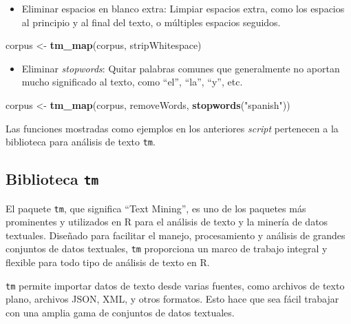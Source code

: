 \documentclass[
]{article}
\newenvironment{Shaded}{\begin{snugshade}}{\end{snugshade}}
\newcommand{\FunctionTok}[1]{\textcolor[rgb]{0.13,0.29,0.53}{\textbf{#1}}}
\newcommand{\NormalTok}[1]{#1}
\newcommand{\OtherTok}[1]{\textcolor[rgb]{0.56,0.35,0.01}{#1}}
\newcommand{\StringTok}[1]{\textcolor[rgb]{0.31,0.60,0.02}{#1}}
\providecommand{\tightlist}{%
  \setlength{\itemsep}{0pt}\setlength{\parskip}{0pt}}
\begin{document}
\begin{itemize}
\tightlist
\item
  Eliminar espacios en blanco extra: Limpiar espacios extra, como los
  espacios al principio y al final del texto, o múltiples espacios
  seguidos.
\end{itemize}

\begin{Shaded}
\begin{Highlighting}[]
\NormalTok{corpus }\OtherTok{\textless{}{-}} \FunctionTok{tm\_map}\NormalTok{(corpus, stripWhitespace)}
\end{Highlighting}
\end{Shaded}

\begin{itemize}
\tightlist
\item
  Eliminar \emph{stopwords}: Quitar palabras comunes que generalmente no
  aportan mucho significado al texto, como ``el'', ``la'', ``y'', etc.
\end{itemize}

\begin{Shaded}
\begin{Highlighting}[]
\NormalTok{corpus }\OtherTok{\textless{}{-}} \FunctionTok{tm\_map}\NormalTok{(corpus, removeWords, }\FunctionTok{stopwords}\NormalTok{(}\StringTok{"spanish"}\NormalTok{))}
\end{Highlighting}
\end{Shaded}

Las funciones mostradas como ejemplos en los anteriores \emph{script}
pertenecen a la biblioteca para análisis de texto \texttt{tm}.

\hypertarget{biblioteca-tm}{%
\subsection{\texorpdfstring{Biblioteca
\texttt{tm}}{Biblioteca tm}}\label{biblioteca-tm}}

El paquete \texttt{tm}, que significa ``Text Mining'', es uno de los
paquetes más prominentes y utilizados en R para el análisis de texto y
la minería de datos textuales. Diseñado para facilitar el manejo,
procesamiento y análisis de grandes conjuntos de datos textuales,
\texttt{tm} proporciona un marco de trabajo integral y flexible para
todo tipo de análisis de texto en R.

\texttt{tm} permite importar datos de texto desde varias fuentes, como
archivos de texto plano, archivos JSON, XML, y otros formatos. Esto hace
que sea fácil trabajar con una amplia gama de conjuntos de datos
textuales.
\end{document}
